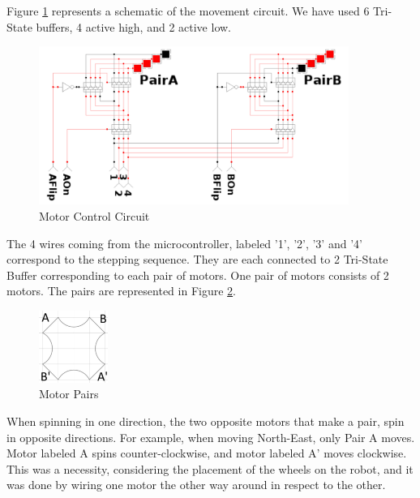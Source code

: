 Figure \ref{fig:mot_ctrl} represents a schematic of the movement circuit. We have used 6 Tri-State 
buffers, 4 active high, and 2 active low. 
\begin{figure}[htp]
	\centering
	\includegraphics[width=0.9\textwidth]{figures/move/direction_choice}
	\caption{Motor Control Circuit}
	\label{fig:mot_ctrl}
\end{figure}

The 4 wires coming from the microcontroller, labeled '1', '2', '3' and '4' correspond to the stepping sequence.
They are each connected to 2 Tri-State Buffer corresponding to each pair of motors. One pair of motors consists 
of 2 motors. The pairs are represented in Figure \ref{fig:motor_pairs_location}.

\begin{figure}[htp]
	\centering
	\includegraphics[width=0.2\textwidth]{figures/move/Motor_pairs_location.jpg}
	\caption{Motor Pairs}
	\label{fig:motor_pairs_location}
\end{figure}
\clearpage
When spinning in one direction, the two opposite motors that make a pair, spin in opposite 
directions. For example, when moving North-East, only Pair A moves. Motor labeled A spins 
counter-clockwise, and motor labeled A’ moves clockwise. This was a necessity, considering the 
placement of the wheels on the robot, and it was done by wiring one motor the other way around in 
respect to the other.

